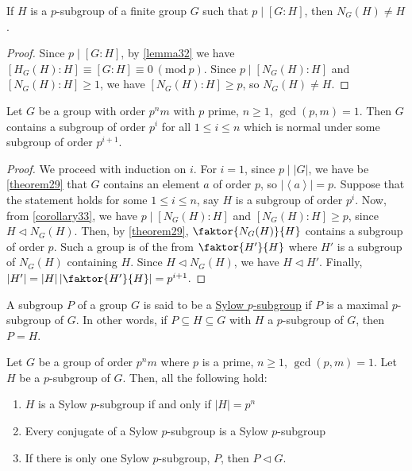 \documentclass[11pt]{article}
\newcommand{\cyclic}[1]{\left\langle #1 \right\rangle}
\newcommand{\quotient}[2]{\faktor{#1}{#2}}
\newcommand{\Mod}[1]{\ (\mathrm{mod}\ #1)}
\begin{document}
\begin{corollary}
If $H$ is a $p$-subgroup of a finite group $G$ such that $p \mid [G:H]$, then
$N_G(H) \neq H$.
\label{corollary33}
\end{corollary}
\begin{proof}
Since $p \mid [G:H]$, by \cref{lemma32} we have $[H_G(H):H] \equiv [G:H] \equiv
0 \Mod{p}$. Since $p \mid [N_G(H):H]$ and $[N_G(H):H] \geq 1$, we have
$[N_G(H):H] \geq p$, so $N_G(H) \neq H$.
\end{proof}
\begin{theorem}
Let $G$ be a group with order $p^nm$ with $p$ prime, $n \geq 1$, $\gcd(p,m)=1$.
Then $G$ contains a subgroup of order $p^i$ for all $1 \leq i \leq n$ which is
normal under some subgroup of order $p^{i+1}$.
\label{fst}
\end{theorem}
\begin{proof}
We proceed with induction on $i$. For $i=1$, since $p \mid |G|$, we have be
\cref{theorem29} that $G$ contains an element $a$ of order $p$, so
$|\cyclic{a}| = p$. Suppose that the statement holds for some $1 \leq i \leq n$,
say $H$ is a subgroup of order $p^i$. Now, from \cref{corollary33}, we have
$p \mid [N_G(H):H]$ and $[N_G(H):H] \geq p$, since $H \triangleleft
N_G(H)$. Then, by \cref{theorem29}, $\quotient{N_G(H)}{H}$ contains a subgroup
of order $p$. Such a group is of the from $\quotient{H'}{H}$ where $H'$ is a
subgroup of $N_G(H)$ containing $H$. Since $H \triangleleft N_G(H)$, we have
$H \triangleleft H'$. Finally, $|H'| = |H|\left|\quotient{H'}{H}\right| =
p^{i+1}$.
\end{proof}
\begin{definition}
A subgroup $P$ of a group $G$ is said to be a \underline{Sylow $p$-subgroup} if
$P$ is a maximal $p$-subgroup of $G$. In other words, if $P \subseteq H
\subseteq G$ with $H$ a $p$-subgroup of $G$, then $P = H$.
\end{definition}
\begin{corollary}
Let $G$ be a group of order $p^nm$ where $p$ is a prime, $n \geq 1$,
$\gcd(p,m)=1$. Let $H$ be a $p$-subgroup of $G$. Then, all the following hold:
\begin{enumerate}
\item $H$ is a Sylow $p$-subgroup if and only if $|H| = p^n$
\item Every conjugate of a Sylow $p$-subgroup is a Sylow $p$-subgroup
\item If there is only one Sylow $p$-subgroup, $P$, then $P \triangleleft G$.
\end{enumerate}
\label{corollary35}
\end{corollary}
\end{document}

